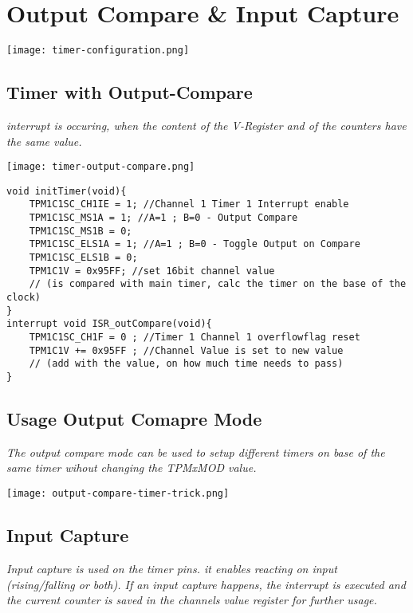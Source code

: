 \section{Output Compare \& Input Capture}

\texttt{[image: timer-configuration.png]}

\subsection{Timer with Output-Compare}

\textit{
    interrupt is occuring, when the content of the V-Register and
    of the counters have the same value.
}

\texttt{[image: timer-output-compare.png]}

\begin{lstlisting}
void initTimer(void){
    TPM1C1SC_CH1IE = 1; //Channel 1 Timer 1 Interrupt enable
    TPM1C1SC_MS1A = 1; //A=1 ; B=0 - Output Compare
    TPM1C1SC_MS1B = 0;
    TPM1C1SC_ELS1A = 1; //A=1 ; B=0 - Toggle Output on Compare
    TPM1C1SC_ELS1B = 0;
    TPM1C1V = 0x95FF; //set 16bit channel value
    // (is compared with main timer, calc the timer on the base of the clock)
}
interrupt void ISR_outCompare(void){
    TPM1C1SC_CH1F = 0 ; //Timer 1 Channel 1 overflowflag reset
    TPM1C1V += 0x95FF ; //Channel Value is set to new value
    // (add with the value, on how much time needs to pass)
}
\end{lstlisting}

\subsection{Usage Output Comapre Mode}

\textit{
    The output compare mode can be used to setup
    different timers on base of the same timer wihout
    changing the TPMxMOD value.
}

\texttt{[image: output-compare-timer-trick.png]}

\subsection{Input Capture}

\textit{
    Input capture is used on the timer pins. it enables
    reacting on input (rising/falling or both).\newline
    If an input capture happens, the interrupt is
    executed and the current counter is saved in the channels
    value register for further usage.
}


